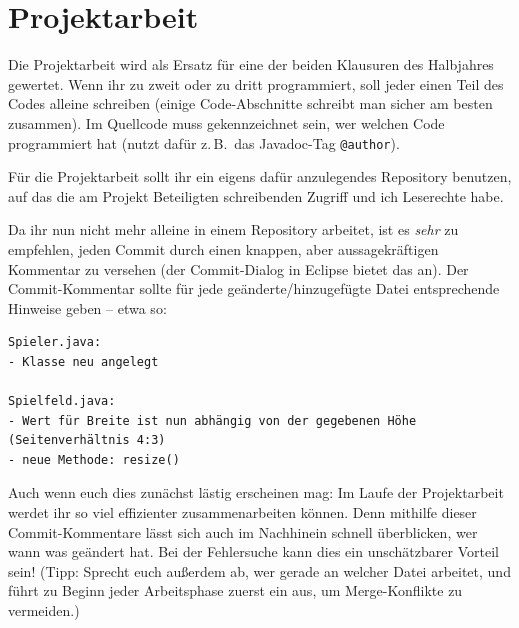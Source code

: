 \chapter{Projektarbeit}
\renewcommand{\chaptertitle}{Projektarbeit}

\lehead[]{\normalfont\sffamily\hspace*{-2.00cm}\textcolor{white}{\colorbox{lightblue}{\makebox[1.60cm][r]{\thechapter}}}\hspace{0.17cm}\textcolor{lightblue}{\chaptertitle}}
\rohead[]{\textcolor{lightblue}{\chaptertitle}\normalfont\sffamily\hspace*{0.17cm}\textcolor{white}{\colorbox{lightblue}{\makebox[1.60cm][l]{\thechapter}}}\hspace{-2.00cm}}
\rehead[]{\textcolor{lightblue}{AvHG, Inf, My}}
\lohead[]{\textcolor{lightblue}{AvHG, Inf, My}}

\lstset{style=myJava}

Die Projektarbeit wird als Ersatz für eine der beiden Klausuren des Halbjahres
gewertet. Wenn ihr zu zweit oder zu dritt programmiert, soll jeder einen Teil
des Codes alleine schreiben (einige Code-Abschnitte schreibt man sicher am
besten zusammen). Im Quellcode muss gekennzeichnet sein, wer welchen Code
programmiert hat (nutzt dafür z.\,B.\ das Javadoc-Tag \lstinline|@author|).

Für die Projektarbeit sollt ihr ein eigens dafür anzulegendes Repository
benutzen, auf das die am Projekt Beteiligten schreibenden Zugriff und ich
Leserechte habe.

Da ihr nun nicht mehr alleine in einem Repository arbeitet, ist es \emph{sehr}
zu empfehlen, jeden Commit durch einen knappen, aber aussagekräftigen Kommentar
zu versehen (der Commit-Dialog in Eclipse bietet das an). Der Commit-Kommentar
sollte für jede geänderte/hinzugefügte Datei entsprechende Hinweise geben --
etwa so:

\begin{lstlisting}
Spieler.java:
- Klasse neu angelegt

Spielfeld.java: 
- Wert für Breite ist nun abhängig von der gegebenen Höhe (Seitenverhältnis 4:3)
- neue Methode: resize()
\end{lstlisting}

Auch wenn euch dies zunächst lästig erscheinen mag: Im Laufe der Projektarbeit
werdet ihr so viel effizienter zusammenarbeiten können. Denn mithilfe dieser
Commit-Kommentare lässt sich auch im Nachhinein schnell überblicken, wer wann
was geändert hat. Bei der Fehlersuche kann dies ein unschätzbarer Vorteil sein!
(Tipp: Sprecht euch außerdem ab, wer gerade an welcher Datei arbeitet, und führt
zu Beginn jeder Arbeitsphase zuerst ein  aus, um Merge-Konflikte zu
vermeiden.)


